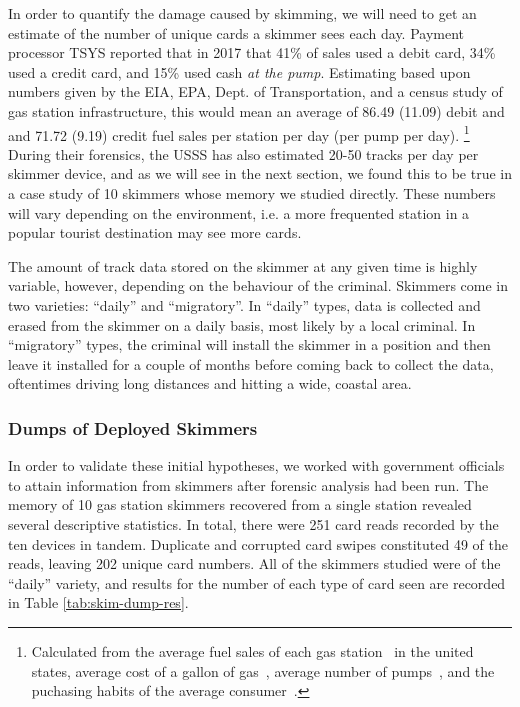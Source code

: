 In order to quantify the damage caused by skimming, we will need to get an estimate of the number of unique cards a
skimmer sees each day.
%
Payment processor TSYS reported that in 2017 that 41\% of sales used a debit card, 34\% used a credit card, and 15\%
used cash \textit{at the pump}. \cite{TSYS}
%
Estimating based upon numbers given by the EIA, EPA, Dept. of Transportation, and a census study of gas station
infrastructure, this would mean an average of 86.49 (11.09) debit and and 71.72 (9.19) credit fuel sales per station
per day (per pump per day).
\footnote{Calculated from the average fuel sales of each gas station~\cite{NACS} in the united states,
average cost of a gallon of gas~\cite{EIAgasPrices}, average number of pumps~\cite{basker2017customer},
and the puchasing habits of the average consumer~\cite{EPAFuelEfficiency, averageDriveDeptOfTrans}.}
During their forensics, the USSS has also estimated 20-50 tracks per day per skimmer device, and as we will see in
the next section, we found this to be true in a case study of 10 skimmers whose memory we studied directly.
%
These numbers will vary depending on the environment, i.e. a more frequented station in a popular tourist destination
may see more cards.

The amount of track data stored on the skimmer at any given time is highly variable, however, depending on the behaviour
of the criminal.
%
Skimmers come in two varieties: ``daily'' and ``migratory''.
%
In ``daily'' types, data is collected and erased from the skimmer on a daily basis, most likely by a local criminal.
%
In ``migratory'' types, the criminal will install the skimmer in a position and then leave it installed for a couple
of months before coming back to collect the data, oftentimes driving long distances and hitting a wide, coastal area.


\subsubsection{Dumps of Deployed Skimmers}

In order to validate these initial hypotheses, we worked with government officials to attain information from skimmers
after forensic analysis had been run.
%
The memory of 10 gas station skimmers recovered from a single station revealed several descriptive statistics.
%
In total, there were 251 card reads recorded by the ten devices in tandem.
%
Duplicate and corrupted card swipes constituted 49 of the reads, leaving 202 unique card numbers.
%
All of the skimmers studied were of the ``daily'' variety, and results for the number of each type of card seen are
recorded in Table \ref{tab:skim-dump-res}.


